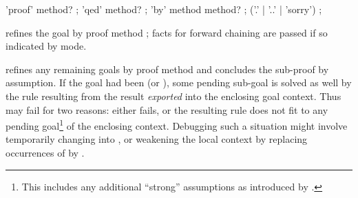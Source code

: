 \begin{isabellebody}
\begin{isamarkuptext}
  \begin{rail}
    'proof' method?
    ;
    'qed' method?
    ;
    'by' method method?
    ;
    ('.' | '..' | 'sorry')
    ;
  \end{rail}

  \begin{descr}
  
  \item [\hyperlink{command.proof}{\mbox{\isa{\isacommand{proof}}}}~\isa{{\isachardoublequote}m\isactrlsub {\isadigit{1}}{\isachardoublequote}}] refines the goal by
  proof method ; facts for forward chaining are
  passed if so indicated by  mode.
  
  \item [\hyperlink{command.qed}{\mbox{\isa{\isacommand{qed}}}}~\isa{{\isachardoublequote}m\isactrlsub {\isadigit{2}}{\isachardoublequote}}] refines any remaining
  goals by proof method  and concludes the
  sub-proof by assumption.  If the goal had been  (or
  ), some pending sub-goal is solved as well by the rule
  resulting from the result \emph{exported} into the enclosing goal
  context.  Thus  may fail for two reasons: either  fails, or the resulting rule does not fit to any
  pending goal\footnote{This includes any additional ``strong''
  assumptions as introduced by \hyperlink{command.assume}{\mbox{}}.} of the enclosing
  context.  Debugging such a situation might involve temporarily
  changing \hyperlink{command.show}{\mbox{}} into \hyperlink{command.have}{\mbox{}}, or weakening the
  local context by replacing occurrences of \hyperlink{command.assume}{\mbox{}} by
  \hyperlink{command.presume}{\mbox{}}.
  

\end{descr}
\end{isamarkuptext}
\end{isabellebody}
